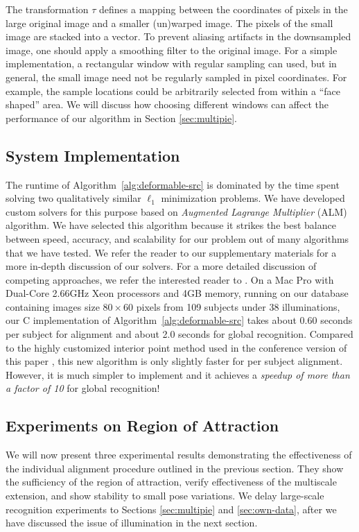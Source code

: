 \documentclass[10pt,journal,letterpaper,compsoc]{IEEEtran}
\begin{document}
The transformation $\tau$ defines a mapping between the
coordinates of pixels in the large original image and a smaller
(un)warped image. The pixels of the small image are stacked into a vector. To prevent aliasing
artifacts in the downsampled image, one should apply a
smoothing filter to the original image. For a simple implementation, a rectangular window with
regular sampling can used, but in general, the small image need
not be regularly sampled in pixel coordinates.  For example,
the sample locations could be arbitrarily selected from within a
``face shaped'' area. We will discuss how choosing
different windows can affect the performance of our algorithm
in Section \ref{sec:multipie}.

\subsection{System Implementation}
The runtime of Algorithm~\ref{alg:deformable-src} is dominated
by the time spent solving two qualitatively similar $\ell_1$ minimization problems.
We have developed custom solvers for this purpose based on
\emph{Augmented Lagrange Multiplier} (ALM) algorithm.
We have selected this algorithm because it strikes the best
balance between speed, accuracy, and scalability for our problem out of
many algorithms that we have tested. We refer the reader to our
supplementary materials for a more in-depth discussion of our
solvers.
For a more detailed discussion of competing
approaches, we refer the interested reader to
\cite{YangA2010-pp}.
On a Mac Pro with
Dual-Core 2.66GHz Xeon processors and 4GB memory,
running on our database containing images size $80\times 60$
pixels from 109 subjects under 38 illuminations,
our C implementation of Algorithm~\ref{alg:deformable-src} takes
about 0.60 seconds per subject for alignment and about 2.0
seconds for global recognition. Compared to the highly
customized interior point method used in the conference version
of this paper \cite{Wagner2009-CVPR}, this new algorithm is
only slightly faster for per subject alignment. However, it is
much simpler to implement and it achieves a
\emph{speedup of more than a factor of 10} for global
recognition!

\subsection{Experiments on Region of Attraction} We will now present three
experimental results demonstrating the effectiveness of the individual
alignment procedure outlined in the previous section. They show the sufficiency
of the region of attraction, verify effectiveness of the multiscale extension,
and show stability to small pose variations.  We delay large-scale recognition
experiments to Sections \ref{sec:multipie} and \ref{sec:own-data}, after we
have discussed the issue of illumination in the next section.
\end{document}
